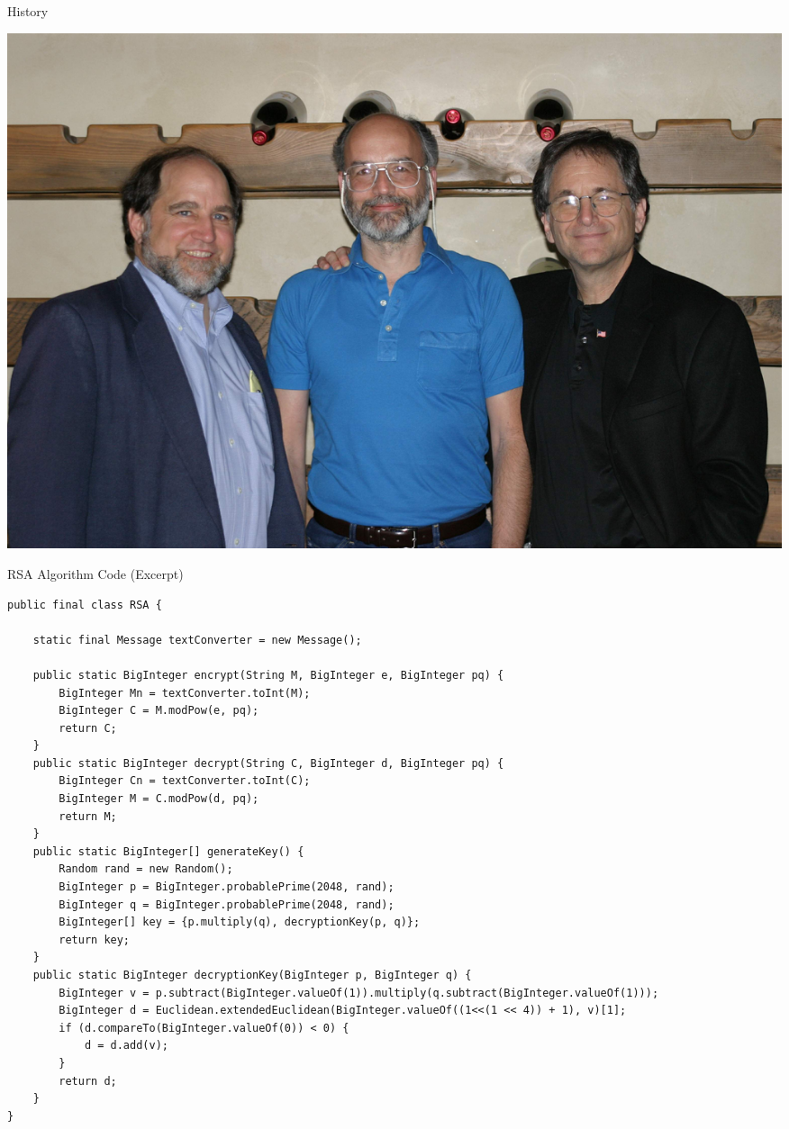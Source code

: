 \documentclass[landscape,fontscale=.4,paperwidth=48in,paperheight=36in]{baposter} %
\begin{document}
\begin{poster}
\begin{posterbox}[name=history, column=13, below=rsa,span=17]{History}
\begin{multicols}{2}
\begin{center}
\includegraphics[width=1\linewidth]{RSA-2003.jpg}
\end{center}
\end{multicols}
\end{posterbox}




\begin{posterbox}[name=code,column=30,span=28,row=0]{RSA Algorithm Code (Excerpt)}

{\begin{verbatim}
public final class RSA {

    static final Message textConverter = new Message();

    public static BigInteger encrypt(String M, BigInteger e, BigInteger pq) {
        BigInteger Mn = textConverter.toInt(M);
        BigInteger C = M.modPow(e, pq);        
        return C;
    }
    public static BigInteger decrypt(String C, BigInteger d, BigInteger pq) {
        BigInteger Cn = textConverter.toInt(C);
        BigInteger M = C.modPow(d, pq);
        return M;
    }
    public static BigInteger[] generateKey() {
        Random rand = new Random();
        BigInteger p = BigInteger.probablePrime(2048, rand);
        BigInteger q = BigInteger.probablePrime(2048, rand);
        BigInteger[] key = {p.multiply(q), decryptionKey(p, q)};
        return key;
    }
    public static BigInteger decryptionKey(BigInteger p, BigInteger q) {
        BigInteger v = p.subtract(BigInteger.valueOf(1)).multiply(q.subtract(BigInteger.valueOf(1)));
        BigInteger d = Euclidean.extendedEuclidean(BigInteger.valueOf((1<<(1 << 4)) + 1), v)[1];
        if (d.compareTo(BigInteger.valueOf(0)) < 0) {
            d = d.add(v);
        }
        return d;
    }
}


\end{verbatim}}
\end{posterbox}
\end{poster}
\end{document}

